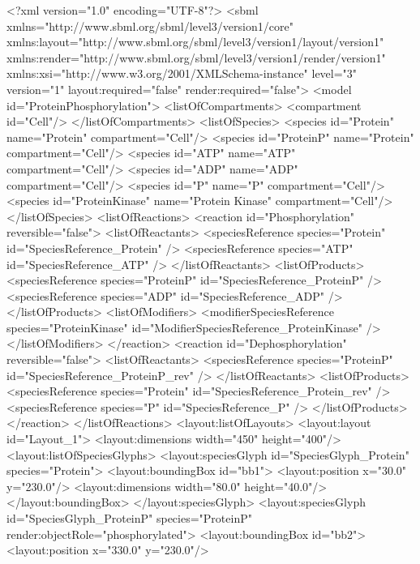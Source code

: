 {\footnotesize
\begin{example}
<?xml version="1.0" encoding="UTF-8"?>
<sbml xmlns="http://www.sbml.org/sbml/level3/version1/core"
      xmlns:layout="http://www.sbml.org/sbml/level3/version1/layout/version1" 
      xmlns:render="http://www.sbml.org/sbml/level3/version1/render/version1"
      xmlns:xsi="http://www.w3.org/2001/XMLSchema-instance"
      level="3" version="1"
      layout:required="false" render:required="false">
 <model id="ProteinPhosphorylation">
  <listOfCompartments>
   <compartment id="Cell"/>
  </listOfCompartments>
  <listOfSpecies>
   <species id="Protein" name="Protein" compartment="Cell"/>
   <species id="ProteinP" name="Protein"  compartment="Cell"/>
   <species id="ATP" name="ATP" compartment="Cell"/>
   <species id="ADP" name="ADP" compartment="Cell"/>
   <species id="P" name="P" compartment="Cell"/>
   <species id="ProteinKinase" name="Protein Kinase" compartment="Cell"/>
  </listOfSpecies>
  <listOfReactions>
   <reaction id="Phosphorylation" reversible="false">
    <listOfReactants>
     <speciesReference species="Protein" id="SpeciesReference_Protein" />
     <speciesReference species="ATP" id="SpeciesReference_ATP" />
    </listOfReactants>
    <listOfProducts>
     <speciesReference species="ProteinP" id="SpeciesReference_ProteinP" />
     <speciesReference species="ADP" id="SpeciesReference_ADP" />
    </listOfProducts>
    <listOfModifiers>
     <modifierSpeciesReference species="ProteinKinase"
                               id="ModifierSpeciesReference_ProteinKinase" />
    </listOfModifiers>
   </reaction>
   <reaction id="Dephosphorylation" reversible="false">
    <listOfReactants>
     <speciesReference species="ProteinP" id="SpeciesReference_ProteinP_rev" />
    </listOfReactants>
    <listOfProducts>
     <speciesReference species="Protein" id="SpeciesReference_Protein_rev" />
     <speciesReference species="P" id="SpeciesReference_P" />
    </listOfProducts>
   </reaction>
  </listOfReactions>
  <layout:listOfLayouts>
   <layout:layout id="Layout_1">
    <layout:dimensions width="450" height="400"/>
    <layout:listOfSpeciesGlyphs>
     <layout:speciesGlyph id="SpeciesGlyph_Protein" species="Protein">
      <layout:boundingBox id="bb1">
       <layout:position x="30.0" y="230.0"/>
       <layout:dimensions width="80.0" height="40.0"/>
      </layout:boundingBox>
     </layout:speciesGlyph>
     <layout:speciesGlyph id="SpeciesGlyph_ProteinP" species="ProteinP" 
                         render:objectRole="phosphorylated">
      <layout:boundingBox id="bb2">
       <layout:position x="330.0" y="230.0"/>

\end{example}}
